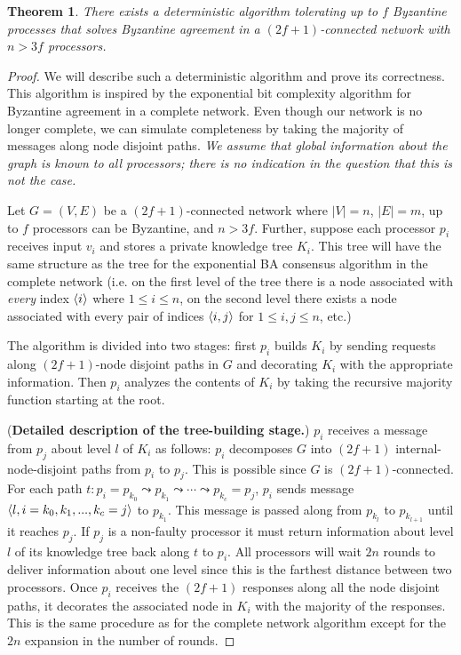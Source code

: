 \documentclass[11pt]{article}
\newtheorem{theorem}{Theorem}
\DeclarePairedDelimiter\anglebrac{\langle}{\rangle}
\begin{document}
\begin{theorem}
\label{thm:byzantinepossible}
There exists a deterministic algorithm tolerating up to $f$ Byzantine processes that solves Byzantine agreement in a $(2f+1)$-connected network with $n > 3f$ processors.
\end{theorem}
\begin{proof}
We will describe such a deterministic algorithm and prove its correctness. This algorithm is inspired by the exponential bit complexity algorithm for Byzantine agreement in a complete network. Even though our network is no longer complete, we can simulate completeness by taking the majority of messages along node disjoint paths. \emph{We assume that global information about the graph is known to all processors; there is no indication in the question that this is not the case.}

Let $G = (V, E)$ be a $(2f+1)$-connected network where $|V| = n$, $|E| = m$, up to $f$ processors can be Byzantine, and $n > 3f$. Further, suppose each processor $p_i$ receives input $v_i$ and stores a private knowledge tree $K_i$. This tree will have the same structure as the tree for the exponential BA consensus algorithm in the complete network (i.e. on the first level of the tree there is a node associated with \emph{every} index $\anglebrac{i}$ where $1 \leq i\leq n$, on the second level there exists a node associated with every pair of indices $\anglebrac{i, j}$ for $1 \leq i, j\leq n$, etc.)

The algorithm is divided into two stages: first $p_i$ builds $K_i$ by sending requests along $(2f+1)$-node disjoint paths in $G$ and decorating $K_i$ with the appropriate information. Then $p_i$ analyzes the contents of $K_i$ by taking the recursive majority function starting at the root.   


(\textbf{Detailed description of the tree-building stage.}) $p_i$ receives a message from $p_j$ about level $l$ of $K_i$ as follows: $p_i$ decomposes $G$ into $(2f+1)$ internal-node-disjoint paths from $p_i$ to $p_j$. This is possible since $G$ is $(2f + 1)$-connected. For each path $t: p_i = p_{k_0} \leadsto p_{k_1} \leadsto \cdots \leadsto p_{k_c} = p_j$, $p_i$ sends message $\anglebrac{l, i=k_0, k_1, ..., k_c=j}$ to $p_{k_1}$. This message is passed along from $p_{k_l}$ to $p_{k_{l+1}}$ until it reaches $p_j$. If $p_j$ is a non-faulty processor it must return information about level $l$ of its knowledge tree back along $t$ to $p_i$. All processors will wait $2n$ rounds to deliver information about one level since this is the farthest distance between two processors. Once $p_i$ receives the $(2f+1)$ responses along all the node disjoint paths, it decorates the associated node in $K_i$ with the majority of the responses. This is the same procedure as for the complete network algorithm except for the $2n$ expansion in the number of rounds.


\end{proof}
\end{document}
